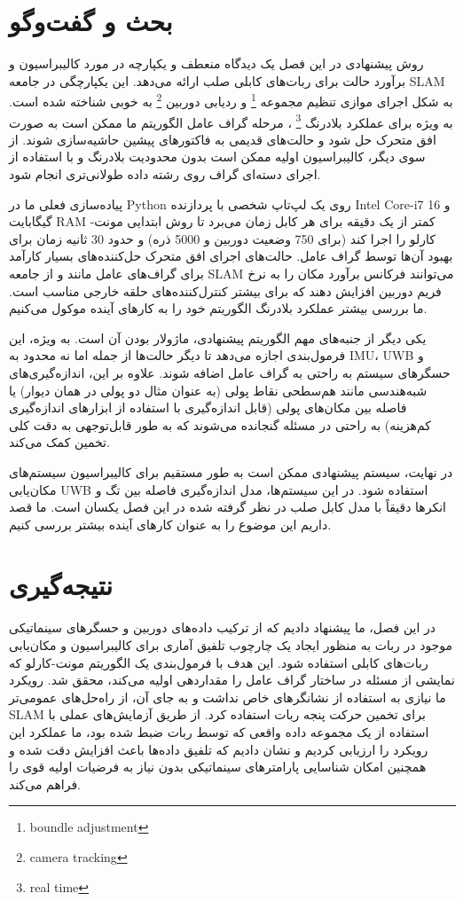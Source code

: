 \section{بحث و گفت‌وگو}
روش پیشنهادی در این فصل یک دیدگاه منعطف و یکپارچه در مورد کالیبراسیون و برآورد حالت برای ربات‌های کابلی صلب ارائه می‌دهد. این یکپارچگی در جامعه SLAM به شکل اجرای موازی تنظیم مجموعه
\footnote{boundle adjustment}
 و ردیابی دوربین 
\footnote{camera tracking}
 به خوبی شناخته شده است. به ویژه برای عملکرد بلادرنگ
\footnote{real time}
 ، مرحله گراف عامل الگوریتم ما ممکن است به صورت افق متحرک حل شود و حالت‌های قدیمی به فاکتورهای پیشین حاشیه‌سازی شوند. از سوی دیگر، کالیبراسیون اولیه ممکن است بدون محدودیت بلادرنگ و با استفاده از اجرای دسته‌ای گراف روی رشته داده طولانی‌تری انجام شود.

پیاده‌سازی فعلی ما در Python روی یک لپ‌تاپ شخصی با پردازنده Intel Core-i7 و 16 گیگابایت RAM کمتر از یک دقیقه برای هر کابل زمان می‌برد تا روش ابتدایی مونت-کارلو را اجرا کند (برای 750 وضعیت دوربین و 5000 ذره) و حدود 30 ثانیه زمان برای بهبود آن‌ها توسط گراف عامل. حالت‌های اجرای افق متحرک حل‌کننده‌های بسیار کارآمد برای گراف‌های عامل مانند 
\cite{dellaert2012factor} و \cite{martiros2022symforce}
 از جامعه SLAM می‌توانند فرکانس برآورد مکان را به نرخ فریم دوربین افزایش دهند که برای بیشتر کنترل‌کننده‌های حلقه خارجی مناسب است. ما بررسی بیشتر عملکرد بلادرنگ الگوریتم خود را به کارهای آینده موکول می‌کنیم.

یکی دیگر از جنبه‌های مهم الگوریتم پیشنهادی، ماژولار بودن آن است. به ویژه، این فرمول‌بندی اجازه می‌دهد تا دیگر حالت‌ها از جمله اما نه محدود به IMU، UWB و حسگرهای سیستم به راحتی به گراف عامل اضافه شوند. علاوه بر این، اندازه‌گیری‌های شبه‌هندسی مانند هم‌سطحی نقاط پولی (به عنوان مثال دو پولی در همان دیوار) یا فاصله بین مکان‌های پولی (قابل اندازه‌گیری با استفاده از ابزارهای اندازه‌گیری کم‌هزینه) به راحتی در مسئله گنجانده می‌شوند که به طور قابل‌توجهی به دقت کلی تخمین کمک می‌کند.

در نهایت، سیستم پیشنهادی ممکن است به طور مستقیم برای کالیبراسیون سیستم‌های مکان‌یابی UWB استفاده شود. در این سیستم‌ها، مدل اندازه‌گیری فاصله بین تگ و انکرها دقیقاً با مدل کابل صلب در نظر گرفته شده در این فصل یکسان است. ما قصد داریم این موضوع را به عنوان کارهای آینده بیشتر بررسی کنیم.


\section{نتیجه‌گیری}

در این فصل، ما پیشنهاد دادیم که از ترکیب داده‌های دوربین و حسگرهای سینماتیکی موجود در ربات به منظور ایجاد یک چارچوب تلفیق آماری برای کالیبراسیون و مکان‌یابی ربات‌های کابلی استفاده شود. این هدف با فرمول‌بندی یک الگوریتم مونت-کارلو که نمایشی از مسئله در ساختار گراف عامل را مقداردهی اولیه می‌کند، محقق شد. رویکرد ما نیازی به استفاده از نشانگرهای خاص نداشت و به جای آن، از راه‌حل‌های عمومی‌تر SLAM برای تخمین حرکت پنجه ربات استفاده کرد. از طریق آزمایش‌های عملی با استفاده از یک مجموعه داده واقعی که توسط ربات  ضبط شده بود، ما عملکرد این رویکرد را ارزیابی کردیم و نشان دادیم که تلفیق داده‌ها باعث افزایش دقت شده و همچنین امکان شناسایی پارامترهای سینماتیکی بدون نیاز به فرضیات اولیه قوی را فراهم می‌کند. 
